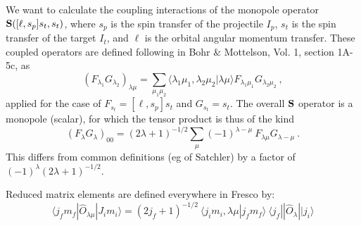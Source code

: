 \documentclass[11pt]{article}
\begin{document}
We want to calculate the coupling interactions of the monopole operator
$   {\bf S}([\ell,s_p]s_t,s_t)  $, where $s_p$ is the spin transfer of the
projectile $I_p$,  $s_t$ is the spin transfer of the
target $I_t$, and $\ell$ is the orbital angular momentum transfer.
These coupled operators are defined following in Bohr \& Mottelson, Vol.
1, section 1A-5c, as
\begin{equation}
(F_{\lambda_1} G_{\lambda_2})_{\lambda \mu}
  = \sum_{\mu_1 \mu_2} \langle \lambda_1 \mu_1 ,  \lambda_2 \mu_2
  |  \lambda \mu \rangle F_{\lambda_1\mu_1} G_{\lambda_2\mu_2} \ ,
\end{equation}
applied for the case of $F_{s_t} = [\ell,s_p]s_t$ and $ G_{s_t}=s_t$.
The overall ${\bf S}$ operator is a monopole (scalar), for which the tensor
product is thus of the kind
\begin{equation}
(F_{\lambda} G_{\lambda})_{00}
  = (2\lambda+1)^{-1/2} \sum_{\mu} (-1)^{\lambda-\mu} ~ F_{\lambda\mu}
  G_{\lambda-\mu} \ .
\end{equation}
This differs from common definitions (eg of Satchler) by a factor of
$ (-1)^\lambda (2\lambda+1)^{-1/2} $.

\bigskip

Reduced matrix elements are defined everywhere in {\sc Fresco} by:
\begin{equation}
\langle j_f m_f | \hat{O}_{\lambda \mu} | J_i m_i \rangle
 = (2j_f+1)^{-1/2} ~ \langle j_i m_i ,\lambda \mu | j_f m_f \rangle ~
\langle j_f || \hat{O}_\lambda || j_i\rangle
\end{equation}
\bigskip
\end{document}
